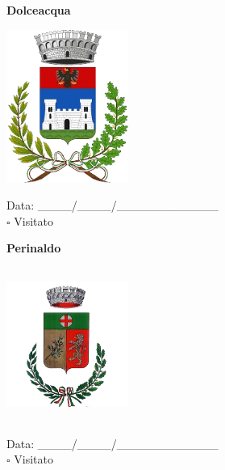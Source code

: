\documentclass[a5paper,12pt]{article}
\begin{document}
\vspace{0.7cm}

\noindent
\begin{minipage}[t]{0.45\textwidth}
    \begin{center}
        \textbf{Dolceacqua}
    \end{center}
    \vspace{-0.5cm} %
    \begin{center}
        \includegraphics[height= 5cm, width=4cm]{Liguria/Stemma Dolceacqua.png}
    \end{center}
    \vspace{-0.4cm} %
    \begin{flushleft}
        Data: \_\_\_\_/\_\_\_\_/\_\_\_\_\_\_\_\_\_\_\_\_ \\
        $\square$ Visitato
    \end{flushleft}
\end{minipage}
\hfill
\noindent
\begin{minipage}[t]{0.45\textwidth}
    \begin{center}
        \textbf{Perinaldo}
    \end{center}
    \vspace{-0.5cm} %
    \begin{center}
        \includegraphics[height= 5cm, width=4cm]{Liguria/Stemma Perinaldo.png}
    \end{center}
    \vspace{-0.4cm} %
    \begin{flushleft}
        Data: \_\_\_\_/\_\_\_\_/\_\_\_\_\_\_\_\_\_\_\_\_ \\
        $\square$ Visitato
    \end{flushleft}
\end{minipage}
\end{document}
